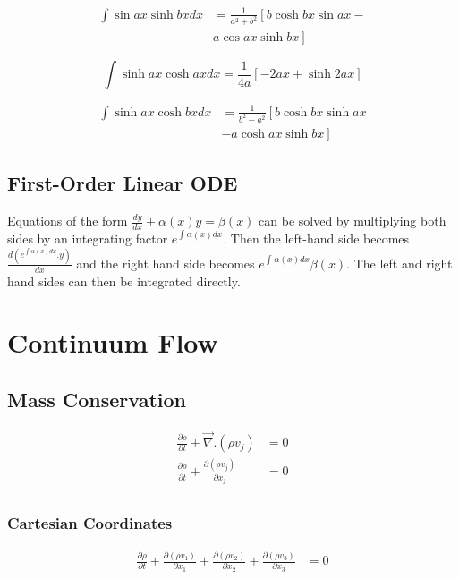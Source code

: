 \documentclass[11pt, letterpaper, notitlepage]{article}
\begin{document}
\begin{multicols}{2}
\begin{footnotesize}
\begin{align}
\int \sin ax \sinh bx dx &= 
\frac{1}{a^2 + b^2} \left[
b \cosh bx \sin ax -
\right . \nonumber \\ & \left .
 a \cos ax \sinh bx
\right] 
\end{align}

\begin{equation}
\int \sinh ax \cosh ax dx= 
\frac{1}{4a}\left[ 
-2ax + \sinh 2ax \right]
\end{equation}

\begin{align}
\int \sinh ax \cosh bx dx&= 
\frac{1}{b^2-a^2}\left[ 
b \cosh bx \sinh ax 
\right . \nonumber \\ & \left .
- a \cosh ax \sinh bx \right]
\end{align}


\end{footnotesize}
\end{multicols}

\subsection{First-Order Linear ODE}
Equations of the form $\frac{dy}{dx} + \alpha(x) y = \beta(x)$ can be solved by multiplying both sides by an integrating factor $e^{\int_{}^{}\alpha(x)dx}$. Then the left-hand side becomes $\frac{d(e^{\int_{}^{}\alpha(x)dx}.y)}{dx}$ and the right hand side becomes $e^{\int_{}^{}\alpha(x)dx} \beta(x)$. The left and right hand sides can then be integrated directly.

\section{Continuum Flow}
\subsection{Mass Conservation}
\begin{align*}
\frac{\partial \rho}{\partial t} + \vec{\nabla} . (\rho v_j) &= 0 \\
\frac{\partial \rho}{\partial t} + \frac{\partial (\rho v_j)}{\partial x_j} &= 0 \\
\end{align*}

\subsubsection{Cartesian Coordinates}
\begin{align*}
\frac{\partial \rho}{\partial t} + \frac{\partial (\rho v_1)}{\partial x_1} + \frac{\partial (\rho v_2)}{\partial x_2} + \frac{\partial (\rho v_3)}{\partial x_3} &= 0 \\
\end{align*}
\end{document}
